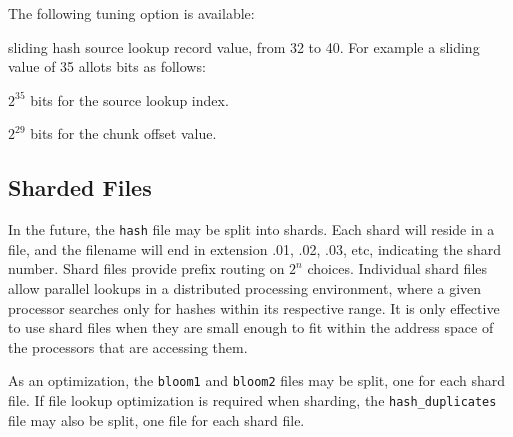 \documentclass[12pt,twoside]{article}
\begin{document}
The following tuning option is available:
\begin{compactitem}
\item sliding hash source lookup record value, from 32 to 40.
For example a sliding value of 35 allots bits as follows:
\begin{compactitem}
\item \begin{math}2^{35}\end{math} bits for the source lookup index.
\item \begin{math}2^{29}\end{math} bits for the chunk offset value.
\end{compactitem}
\end{compactitem}

\subsection{Sharded Files}
In the future, the \texttt{hash} file may be split into shards.
Each shard will reside in a file, and the filename will end in extension .01, .02, .03, etc,
indicating the shard number.
Shard files provide prefix routing on \begin{math}2^{n}\end{math} choices.
Individual shard files allow parallel lookups in a distributed processing environment,
where a given processor searches only for hashes within its respective range.
It is only effective to use shard files when they are small enough
to fit within the address space of the processors that are accessing them.

As an optimization, the \texttt{bloom1} and \texttt{bloom2} files may be split,
one for each shard file.
If file lookup optimization is required when sharding,
the \texttt{hash\_duplicates} file may also be split,
one file for each shard file.
\end{document}
